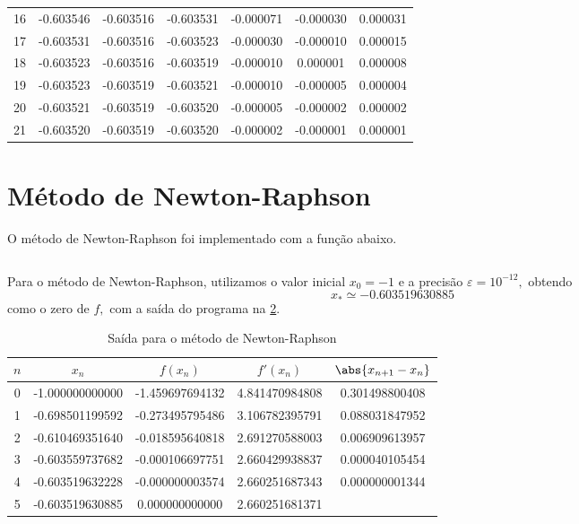 \documentclass[portuguese,minted]{artigo}
\begin{document}
\begin{table}[H]
\begin{tabular}{c c c c c c c}
            16 &-0.603546 &-0.603516 &-0.603531 &-0.000071 &-0.000030 &0.000031\\
            17 &-0.603531 &-0.603516 &-0.603523 &-0.000030 &-0.000010 &0.000015\\
            18 &-0.603523 &-0.603516 &-0.603519 &-0.000010 & 0.000001 &0.000008\\
            19 &-0.603523 &-0.603519 &-0.603521 &-0.000010 &-0.000005 &0.000004\\
            20 &-0.603521 &-0.603519 &-0.603520 &-0.000005 &-0.000002 &0.000002\\
            21 &-0.603520 &-0.603519 &-0.603520 &-0.000002 &-0.000001 &0.000001\\
            \bottomrule
        \end{tabular}
        \label{tab:a}
    \end{table}

    \section{Método de Newton-Raphson}
    O método de Newton-Raphson foi implementado com a função abaixo.
    \inputminted[firstline=38,lastline=57]{c}{src/main.c}

    Para o método de Newton-Raphson, utilizamos o valor inicial \(x_0 = -1\) e a precisão \(\varepsilon = 10^{-12},\) obtendo
    \begin{equation*}
        x_* \simeq -0.603519630885
    \end{equation*}
    como o zero de \(f,\) com a saída do programa na \cref{tab:b}.

    \begin{table}[H]
        \centering
        \caption{Saída para o método de Newton-Raphson}
        \begin{tabular}{c c c c c}
            \toprule
            \(n\) & \(x_n\) & \(f(x_n)\) & \(f'(x_n)\) & \(\abs{x_{n+1} - x_{n}}\)\\
            \midrule
            0 &-1.000000000000 &-1.459697694132 & 4.841470984808 &0.301498800408\\
            1 &-0.698501199592 &-0.273495795486 & 3.106782395791 &0.088031847952\\
            2 &-0.610469351640 &-0.018595640818 & 2.691270588003 &0.006909613957\\
            3 &-0.603559737682 &-0.000106697751 & 2.660429938837 &0.000040105454\\
            4 &-0.603519632228 &-0.000000003574 & 2.660251687343 &0.000000001344\\
            5 &-0.603519630885 &0.000000000000 & 2.660251681371 &\\
            \bottomrule
        \end{tabular}
        \label{tab:b}
    \end{table}
\end{document}
